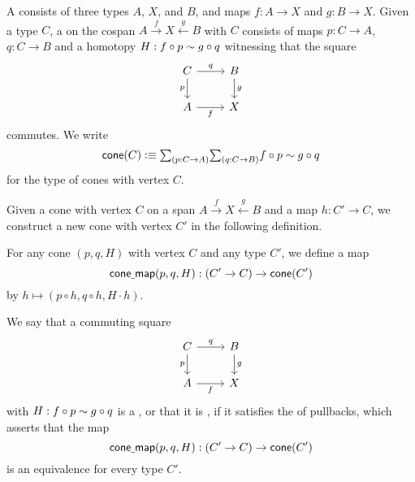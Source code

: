 \begin{defn}\label{defn:cospan}
A  consists of three types $A$, $X$, and $B$, and maps $f:A\to X$ and $g:B\to X$. Given a type $C$, a  on the cospan $A \stackrel{f}{\rightarrow} X \stackrel{g}{\leftarrow} B$ with  $C$ consists of maps $p:C\to A$, $q:C\to B$ and a homotopy $H:f\circ p\sim g\circ q$ witnessing that the square
\begin{equation*}
\begin{tikzcd}
C \arrow[r,"q"] \arrow[d,swap,"p"] & B \arrow[d,"g"] \\
A \arrow[r,swap,"f"] & X
\end{tikzcd}
\end{equation*}
commutes. We write
\begin{equation*}
\cone(C)\defeq \sm{p:C\to A}{q:C\to B}f\circ p\htpy g\circ q
\end{equation*}
for the type of cones with vertex $C$.
\end{defn}

Given a cone with vertex $C$ on a span $A\stackrel{f}{\rightarrow} X \stackrel{g}{\leftarrow} B$ and a map $h:C'\to C$, we construct a new cone with vertex $C'$ in the following definition.

\begin{defn}
For any cone $(p,q,H)$ with vertex $C$ and any type $C'$, we define a map
\begin{equation*}
\mathsf{cone\underline{\ }{}map}(p,q,H):(C'\to C)\to\mathsf{cone}(C')
\end{equation*}
by $h\mapsto (p\circ h,q\circ h,H\cdot h)$. 
\end{defn}

\begin{defn}
We say that a commuting square
\begin{equation*}
\begin{tikzcd}
C \arrow[r,"q"] \arrow[d,swap,"p"] & B \arrow[d,"g"] \\
A \arrow[r,swap,"f"] & X
\end{tikzcd}
\end{equation*}
with $H:f\circ p\sim g\circ q$ is a , or that it is , if it satisfies the  of pullbacks, which asserts that the map
\begin{equation*}
\mathsf{cone\underline{\ }{}map}(p,q,H):(C'\to C)\to\mathsf{cone}(C')
\end{equation*}
is an equivalence for every type $C'$. 
\end{defn}

